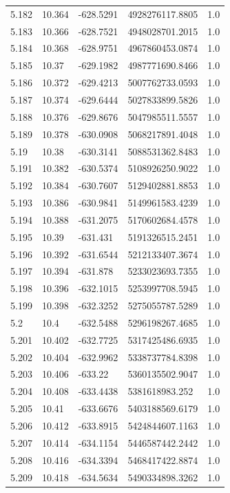 \begin{tabular}{lllll}
5.182 & 10.364 & -628.5291 & 4928276117.8805 & 1.0 \\
5.183 & 10.366 & -628.7521 & 4948028701.2015 & 1.0 \\
5.184 & 10.368 & -628.9751 & 4967860453.0874 & 1.0 \\
5.185 & 10.37 & -629.1982 & 4987771690.8466 & 1.0 \\
5.186 & 10.372 & -629.4213 & 5007762733.0593 & 1.0 \\
5.187 & 10.374 & -629.6444 & 5027833899.5826 & 1.0 \\
5.188 & 10.376 & -629.8676 & 5047985511.5557 & 1.0 \\
5.189 & 10.378 & -630.0908 & 5068217891.4048 & 1.0 \\
5.19 & 10.38 & -630.3141 & 5088531362.8483 & 1.0 \\
5.191 & 10.382 & -630.5374 & 5108926250.9022 & 1.0 \\
5.192 & 10.384 & -630.7607 & 5129402881.8853 & 1.0 \\
5.193 & 10.386 & -630.9841 & 5149961583.4239 & 1.0 \\
5.194 & 10.388 & -631.2075 & 5170602684.4578 & 1.0 \\
5.195 & 10.39 & -631.431 & 5191326515.2451 & 1.0 \\
5.196 & 10.392 & -631.6544 & 5212133407.3674 & 1.0 \\
5.197 & 10.394 & -631.878 & 5233023693.7355 & 1.0 \\
5.198 & 10.396 & -632.1015 & 5253997708.5945 & 1.0 \\
5.199 & 10.398 & -632.3252 & 5275055787.5289 & 1.0 \\
5.2 & 10.4 & -632.5488 & 5296198267.4685 & 1.0 \\
5.201 & 10.402 & -632.7725 & 5317425486.6935 & 1.0 \\
5.202 & 10.404 & -632.9962 & 5338737784.8398 & 1.0 \\
5.203 & 10.406 & -633.22 & 5360135502.9047 & 1.0 \\
5.204 & 10.408 & -633.4438 & 5381618983.252 & 1.0 \\
5.205 & 10.41 & -633.6676 & 5403188569.6179 & 1.0 \\
5.206 & 10.412 & -633.8915 & 5424844607.1163 & 1.0 \\
5.207 & 10.414 & -634.1154 & 5446587442.2442 & 1.0 \\
5.208 & 10.416 & -634.3394 & 5468417422.8874 & 1.0 \\
5.209 & 10.418 & -634.5634 & 5490334898.3262 & 1.0 \\

\end{tabular}
